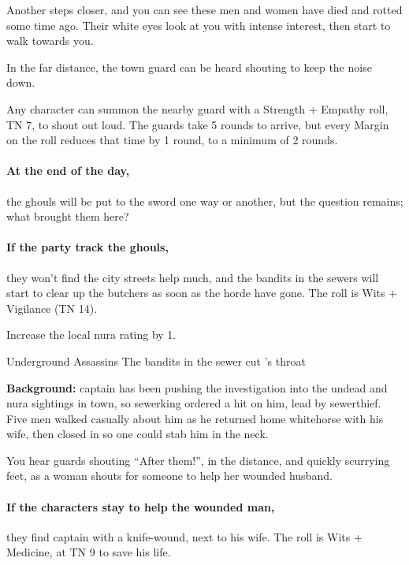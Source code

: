 \begin{multicols}{2}
\begin{boxtext}
  Another steps closer, and you can see these men and women have died and rotted some time ago.
  Their white eyes look at you with intense interest, then start to walk towards you.

  In the far distance, the town guard can be heard shouting to keep the noise down.

\end{boxtext}

Any character can summon the nearby guard with a Strength + Empathy roll, TN 7, to shout out loud.
The guards take 5 rounds to arrive, but every Margin on the roll reduces that time by 1 round, to a minimum of 2 rounds.


\paragraph{At the end of the day,}
the ghouls will be put to the sword one way or another, but the question remains; what brought them here?

\paragraph{If the party track the ghouls,}
they won't find the city streets help much, and the bandits in the sewers will start to clear up the butchers as soon as the horde have gone.
The roll is Wits + Vigilance (TN 14).

Increase the local nura rating by 1.

{\N Underground Assassins}%
{The bandits in the sewer cut 's throat}%

\textbf{Background:}
\Gls{captain} has been pushing the investigation into the undead and nura sightings in town, so \gls{sewerking} ordered a hit on him, lead by \gls{sewerthief}.
Five men walked casually about him as he returned home \gls{whitehorse} with his wife, then closed in so one could stab him in the neck.

\begin{boxtext}

  You hear guards shouting ``After them!'', in the distance, and quickly scurrying feet, as a woman shouts for someone to help her wounded husband.

\end{boxtext}

\paragraph{If the characters stay to help the wounded man,}
they find \gls{captain} with a knife-wound, next to his wife.
The roll is Wits + Medicine, at TN 9 to save his life.


\end{multicols}
